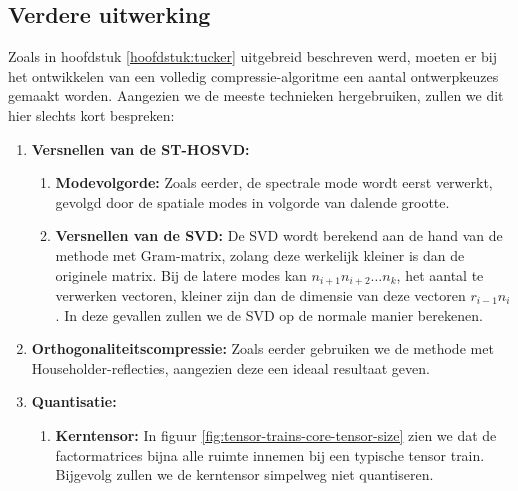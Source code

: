 \newpage
\subsection{Verdere uitwerking}

Zoals in hoofdstuk \ref{hoofdstuk:tucker} uitgebreid beschreven werd, moeten er bij het ontwikkelen van een volledig compressie-algoritme een aantal ontwerpkeuzes gemaakt worden. Aangezien we de meeste technieken hergebruiken, zullen we dit hier slechts kort bespreken:

\begin{enumerate}
\item \textbf{Versnellen van de ST-HOSVD:}
\begin{enumerate}
\item \textbf{Modevolgorde:} Zoals eerder, de spectrale mode wordt eerst verwerkt, gevolgd door de spatiale modes in volgorde van dalende grootte.
\item \textbf{Versnellen van de SVD:} De SVD wordt berekend aan de hand van de methode met Gram-matrix, zolang deze werkelijk kleiner is dan de originele matrix. Bij de latere modes kan $n_{i+1} n_{i+2} \dots n_k$, het aantal te verwerken vectoren, kleiner zijn dan de dimensie van deze vectoren $r_{i-1} n_i$. In deze gevallen zullen we de SVD op de normale manier berekenen.
\end{enumerate}
\item \textbf{Orthogonaliteitscompressie:} Zoals eerder gebruiken we de methode met Householder-reflecties, aangezien deze een ideaal resultaat geven.
\item \textbf{Quantisatie:}
\begin{enumerate}
\item \textbf{Kerntensor:} In figuur \ref{fig:tensor-trains-core-tensor-size} zien we dat de factormatrices bijna alle ruimte innemen bij een typische tensor train. Bijgevolg zullen we de kerntensor simpelweg niet quantiseren.


\end{enumerate}
\end{enumerate}
